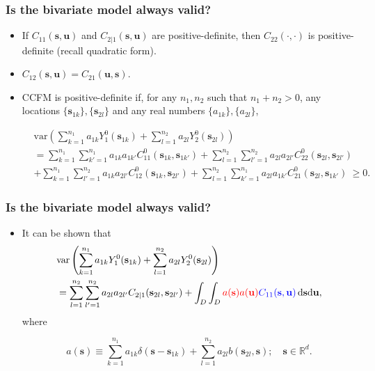 \documentclass{beamer}
\newcommand{\svec} {\textbf{s}}
\newcommand{\uvec} {\textbf{u}}
\newcommand{\s}{\mathbf{s}}
\renewcommand{\u}{\mathbf{u}}
\renewcommand{\d}{\mathrm{d}}
\newcommand{\var}{\mathrm{var}}
\newcommand{\RR}{\mathbb{R}}
\newcommand{\red}{\textcolor{red}}%
\newcommand{\blue}{\textcolor{blue}}
\begin{document}

\begin{frame}
\frametitle{Is the bivariate model always valid?}

\begin{itemize}
\item If $C_{11}(\svec,\uvec)$ and $C_{2|1}(\svec,\uvec)$ are positive-definite, then $C_{22}(\cdot,\cdot)$ is positive-definite (recall quadratic form).
\item $C_{12}(\svec,\uvec) = C_{21}(\uvec,\svec)$.
\item CCFM is positive-definite if, for any $n_1,n_2$ such that $n_1 + n_2 > 0$, any locations $\{\svec_{1k}\}, \{\svec_{2l}\}$ and any real numbers $\{a_{1k}\},\{a_{2l}\}$,

\small
\begin{align*}
 & \var\left(\sum_{k=1}^{n_1}{a_{1k}Y_1^0(\s_{1k})}+\sum_{l=1}^{n_2}{a_{2l}Y_2^0(\s_{2l})}\right) \\ &=\sum_{k=1}^{n_1}\sum_{k'=1}^{n_1} a_{1k}a_{1k'}C_{11}^0(\s_{1k},\s_{1k'})+\sum_{l=1}^{n_2}\sum_{l'=1}^{n_2} a_{2l}a_{2l'}C_{22}^0(\s_{2l},\s_{2l'}) \\
  &+\sum_{k=1}^{n_1}\sum_{l'=1}^{n_2} a_{1k}a_{2l'}C_{12}^0(\s_{1k},\s_{2l'})+\sum_{l=1}^{n_2}\sum_{k'=1}^{n_1} a_{2l}a_{1k'}C_{21}^0(\s_{2l},\s_{1k'})~ \ge 0.
\end{align*}

\normalsize
\end{itemize}
\end{frame}


\begin{frame}
\frametitle{Is the bivariate model always valid?}

\begin{itemize}
\item It can be shown that
\begin{align*}
& \var\left(\sum_{k=1}^{n_1}{a_{1k}Y_1^0(\s_{1k})}+\sum_{l=1}^{n_2}{a_{2l}Y_2^0(\s_{2l})}\right)\\
&= \sum_{l=1}^{n_2}\sum_{l'=1}^{n_2}a_{2l}a_{2l'}C_{2\mid 1}(\s_{2l},\s_{2l'})+\int_D \int_D{\red{a(\s)a(\u)}\blue{C_{11}(\s,\u)}\,\d\s\d\u},
\end{align*}
where

\begin{equation*}
a(\s)\equiv \sum_{k=1}^{n_1}a_{1k}\delta(\s-\s_{1k})+\sum_{l=1}^{n_2}a_{2l}b(\s_{2l},\s);\quad \s\in \RR^d.
\end{equation*}

\end{itemize}
\end{frame}
\end{document}
